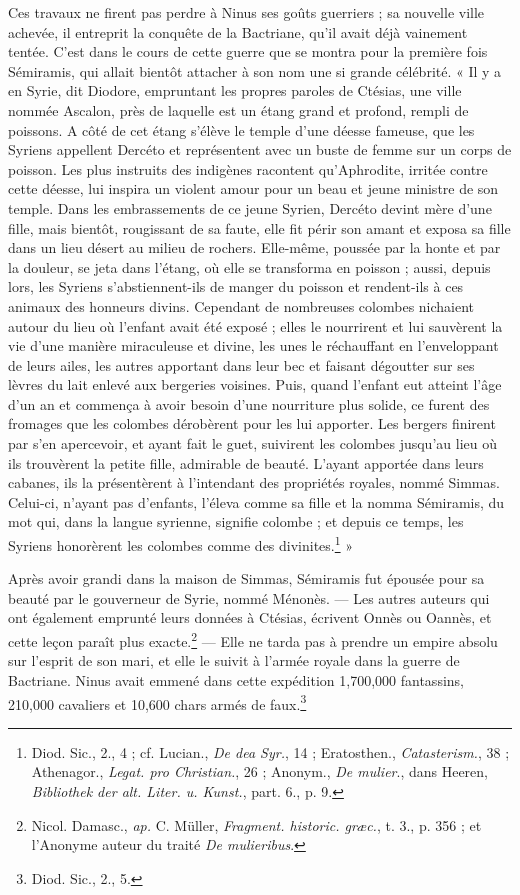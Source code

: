 \documentclass[a4paper, 11pt, oneside]{article}
\begin{document}
Ces travaux ne firent pas perdre à Ninus ses goûts guerriers ; sa nouvelle ville achevée, il entreprit la conquête de la Bactriane, qu'il avait déjà vainement tentée. C'est dans le cours de cette guerre que se montra pour la première fois Sémiramis, qui allait bientôt attacher à son nom une si grande célébrité. « Il y a en Syrie, dit Diodore, empruntant les propres paroles de Ctésias, une ville nommée Ascalon, près de laquelle est un étang grand et profond, rempli de poissons. A côté de cet étang s'élève le temple d'une déesse fameuse, que les Syriens appellent Dercéto et représentent avec un buste de femme sur un corps de poisson. Les plus instruits des indigènes racontent qu'Aphrodite, irritée contre cette déesse, lui inspira un violent amour pour un beau et jeune ministre de son temple. Dans les embrassements de ce jeune Syrien, Dercéto devint mère d'une fille, mais bientôt, rougissant de sa faute, elle fit périr son amant et exposa sa fille dans un lieu désert au milieu de rochers. Elle-même, poussée par la honte et par la douleur, se jeta dans l'étang, où elle se transforma en poisson ; aussi, depuis lors, les Syriens s'abstiennent-ils de manger du poisson et rendent-ils à ces animaux des honneurs divins. Cependant de nombreuses colombes nichaient autour du lieu où l'enfant avait été exposé ; elles le nourrirent et lui sauvèrent la vie d'une manière miraculeuse et divine, les unes le réchauffant en l'enveloppant de leurs ailes, les autres apportant dans leur bec et faisant dégoutter sur ses lèvres du lait enlevé aux bergeries voisines. Puis, quand l'enfant eut atteint l'âge d'un an et commença à avoir besoin d'une nourriture plus solide, ce furent des fromages que les colombes dérobèrent pour les lui apporter. Les bergers finirent par s'en apercevoir, et ayant fait le guet, suivirent les colombes jusqu'au lieu où ils trouvèrent la petite fille, admirable de beauté. L'ayant apportée dans leurs cabanes, ils la présentèrent à l'intendant des propriétés royales, nommé Simmas. Celui-ci, n'ayant pas d'enfants, l'éleva comme sa fille et la nomma Sémiramis, du mot qui, dans la langue syrienne, signifie colombe ; et depuis ce temps, les Syriens honorèrent les colombes comme des divinites.\footnote{Diod. Sic., 2., 4 ; cf. Lucian., \emph{De dea Syr.}, 14 ; Eratosthen., \emph{Catasterism.}, 38 ; Athenagor., \emph{Legat. pro Christian.}, 26 ; Anonym., \emph{De mulier}., dans Heeren, \emph{Bibliothek der alt. Liter. u. Kunst.}, part. 6., p. 9.} »

Après avoir grandi dans la maison de Simmas, Sémiramis fut épousée pour sa beauté par le gouverneur de Syrie, nommé Ménonès. --- Les autres auteurs qui ont également emprunté leurs données à Ctésias, écrivent Onnès ou Oannès, et cette leçon paraît plus exacte.\footnote{Nicol. Damasc., \emph{ap.} C. Müller, \emph{Fragment. historic. græc.}, t. 3., p. 356 ; et l'Anonyme auteur du traité \emph{De mulieribus}.} --- Elle ne tarda pas à prendre un empire absolu sur l'esprit de son mari, et elle le suivit à l'armée royale dans la guerre de Bactriane. Ninus avait emmené dans cette expédition 1,700,000 fantassins, 210,000 cavaliers et 10,600 chars armés de faux.\footnote{Diod. Sic., 2., 5.}
\end{document}

